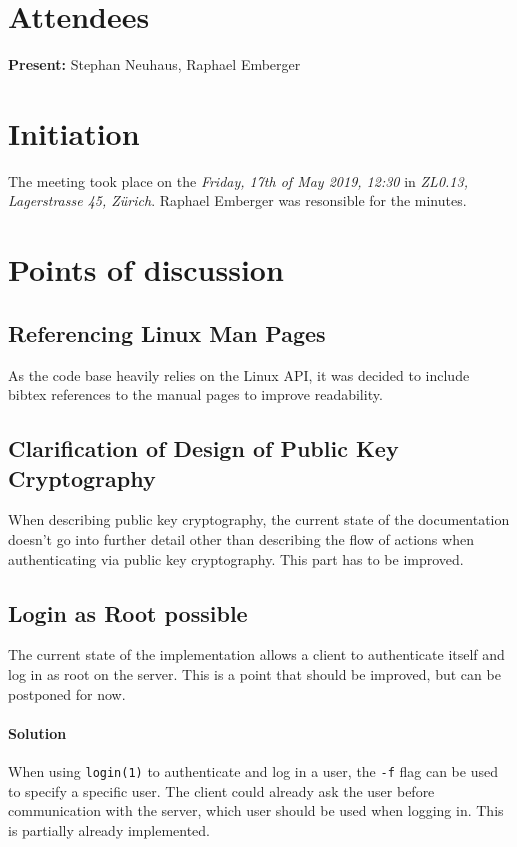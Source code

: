 \documentclass[10pt,a4paper,twoside,english,minutes]{zhawreprt}
\begin{document}
\maketitle

\section{Attendees}\label{sec:Attandees}
\textbf{Present:} Stephan Neuhaus, Raphael Emberger

\section{Initiation}\label{sec:Initiation}
The meeting took place on the \textit{Friday, 17th of May 2019, 12:30} in \textit{ZL0.13, Lagerstrasse 45, Zürich}. Raphael Emberger was resonsible for the minutes.

\section{Points of discussion}
\subsection{Referencing Linux Man Pages}
As the code base heavily relies on the Linux API, it was decided to include bibtex references to the manual pages to improve readability.

\subsection{Clarification of Design of Public Key Cryptography}
When describing public key cryptography, the current state of the documentation doesn't go into further detail other than describing the flow of actions when authenticating via public key cryptography. This part has to be improved.

\subsection{Login as Root possible}
The current state of the implementation allows a client to authenticate itself and log in as root on the server. This is a point that should be improved, but can be postponed for now.
\paragraph{Solution}
When using \texttt{login(1)} to authenticate and log in a user, the \texttt{-f} flag can be used to specify a specific user. The client could already ask the user before communication with the server, which user should be used when logging in. This is partially already implemented.
\end{document}
